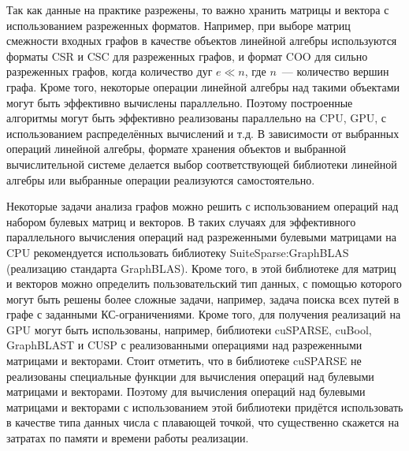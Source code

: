Так как данные на практике разрежены, то важно хранить матрицы и вектора с использованием разреженных форматов. Например, при выборе матриц смежности входных графов в качестве объектов линейной алгебры используются форматы CSR и CSC для разреженных графов, и формат COO для сильно разреженных графов, когда количество дуг $e \ll n$, где $n$~--- количество вершин графа. Кроме того, некоторые операции линейной алгебры над такими объектами могут быть эффективно вычислены параллельно. Поэтому построенные алгоритмы могут быть эффективно реализованы параллельно на CPU, GPU, с использованием распределённых вычислений и т.д. В зависимости от выбранных операций линейной алгебры, формате хранения объектов и выбранной вычислительной системе делается выбор соответствующей библиотеки линейной алгебры или выбранные операции реализуются самостоятельно.


Некоторые задачи анализа графов можно решить с использованием операций над набором булевых матриц и векторов. В таких случаях для эффективного параллельного вычисления операций над разреженными булевыми матрицами на CPU рекомендуется использовать библиотеку SuiteSparse:GraphBLAS (реализацию стандарта GraphBLAS). Кроме того, в этой библиотеке для матриц и векторов можно определить пользовательский тип данных, с помощью которого могут быть решены более сложные задачи, например, задача поиска всех путей в графе с заданными КС-ограничениями. Кроме того, для получения реализаций на GPU могут быть использованы, например, библиотеки cuSPARSE, cuBool, GraphBLAST и CUSP с реализованными операциями над разреженными матрицами и векторами. Стоит отметить, что в библиотеке cuSPARSE не реализованы специальные функции для вычисления операций над булевыми матрицами и векторами. Поэтому для вычисления операций над булевыми матрицами и векторами с использованием этой библиотеки придётся использовать в качестве типа данных числа с плавающей точкой, что существенно скажется на затратах по памяти и времени работы реализации.


